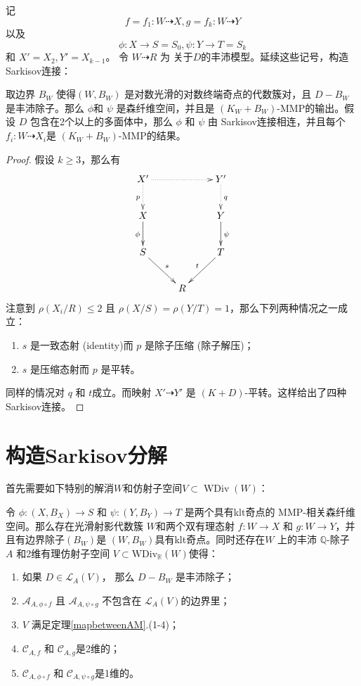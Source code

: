 记 
\[ f=f_1:W\dashrightarrow X, g=f_k:W\dashrightarrow Y \]
以及 
\[ \phi:X\to S=S_0,\psi:Y\to T=S_k \]
和 $ X'=X_2,Y'=X_{k-1}$。 令 $ W\dashrightarrow R $ 为 关于$ D $的丰沛模型。延续这些记号，构造Sarkisov连接：
\begin{theorem}\label{constructlink}
  \cite[Theorem 3.7]{haconSarkisovProgram2012} 取边界 $ B_W $ 使得$ (W,B_W) $ 是对数光滑的对数终端奇点的代数簇对，且 $ D-B_W $ 是丰沛除子。那么 $ \phi $和 $ \psi $ 是森纤维空间，并且是 $ (K_W+B_W) $-MMP的输出。假设 $ D $ 包含在2个以上的多面体中，那么 $\phi$ 和 $\psi$ 由 Sarkisov连接相连，并且每个 $f_{i}:W \dashrightarrow  X_{i}$是  $(K_{W}+B_{W})$-MMP的结果。
\end{theorem}
\begin{proof}
  假设 $ k\geqslant 3 $，那么有
  \[ \xymatrix{
      X'\ar@{.>}[d]_p\ar@{.>}[rr]&&Y'\ar@{.>}[d]^q\\
      X\ar[d]_{\phi}&&Y\ar[d]^\psi\\
      S\ar[rd]^s&&T\ar[ld]_t\\
      &R&} \]
  注意到 $ \rho(X_i/R)\leqslant 2 $ 且 $ \rho(X/S)=\rho(Y/T)=1 $，那么下列两种情况之一成立：
  \begin{enumerate}
    \item $ s $ 是一致态射 (identity)而 $ p $ 是除子压缩 (除子解压)；
    \item $ s $ 是压缩态射而 $ p $ 是平转。
  \end{enumerate}
  同样的情况对 $ q $ 和 $ t $成立。而映射 $X'\dashrightarrow Y'$ 是 $(K+D)$-平转。这样给出了四种Sarkisov连接。
\end{proof}

\section{构造Sarkisov分解}
首先需要如下特别的解消$W$和仿射子空间$V \subset \operatorname{WDiv}(W)$：

\begin{lemma}\label{keylemma}
  \cite[Lemma 4.1]{haconSarkisovProgram2012} 令 $ \phi: (X,B_{X}) \to S $ 和 $ \psi: (Y,B_{Y})\to T  $ 是两个具有klt奇点的 MMP-相关森纤维空间。那么存在光滑射影代数簇 $ W $和两个双有理态射 $ f:W\to X $  和 $ g:W\to Y $，并且有边界除子$(B_{W})$是 $ (W,B_{W}) $具有klt奇点。同时还存在$W$ 上的丰沛 $ \mathbb{Q} $-除子 $ A $ 和2维有理仿射子空间 $ V \subset \mathrm{WDiv}_{\mathbb{R}}(W) $使得：
  \begin{enumerate}
    \item 如果 $ D\in \mathcal{L}_A(V) $， 那么 $ D-B_W $ 是丰沛除子；
    \item $ \mathcal{A}_{A,\phi\circ f} $ 且 $ \mathcal{A}_{A,\psi\circ g} $ 不包含在 $ \mathcal{L}_A(V) $的边界里；
    \item $ V $ 满足定理\ref{mapbetweenAM}.(1-4)；
    \item $ \mathcal{C}_{A,f} $ 和 $ \mathcal{C}_{A,g} $是2维的； 
    \item $ \mathcal{C}_{A,\phi\circ f} $ 和 $ \mathcal{C}_{A,\psi\circ g} $是1维的。 
  \end{enumerate}
\end{lemma}

